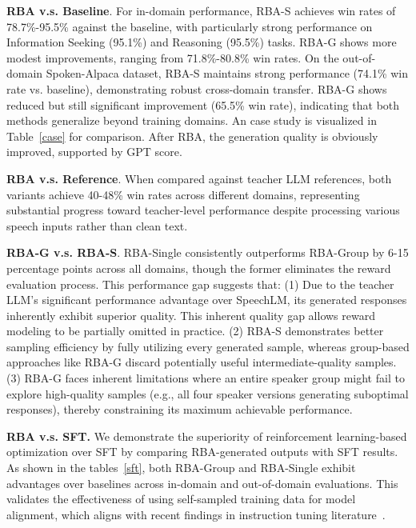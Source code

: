 \documentclass[letterpaper]{article} %
\begin{document}
\noindent \textbf{RBA v.s. Baseline}. For in-domain performance, RBA-S achieves win rates of 78.7\%-95.5\% against the baseline, with particularly strong performance on Information Seeking (95.1\%) and Reasoning (95.5\%) tasks. RBA-G shows more modest improvements, ranging from 71.8\%-80.8\% win rates. On the out-of-domain Spoken-Alpaca dataset, RBA-S maintains strong performance (74.1\% win rate vs. baseline), demonstrating robust cross-domain transfer. RBA-G shows reduced but still significant improvement (65.5\% win rate), indicating that both methods generalize beyond training domains. An case study is visualized in Table~\ref{case} for comparison. After RBA, the generation quality is obviously improved, supported by GPT score.  \par
\noindent \textbf{RBA v.s. Reference}. When compared against teacher LLM references, both variants achieve 40-48\% win rates across different domains, representing substantial progress toward teacher-level performance despite processing various speech inputs rather than clean text. \par
\noindent \textbf{RBA-G v.s. RBA-S}. RBA-Single consistently outperforms RBA-Group by 6-15 percentage points across all domains, though the former eliminates the reward evaluation process. This performance gap suggests that: (1) Due to the teacher LLM's significant performance advantage over SpeechLM, its generated responses inherently exhibit superior quality. This inherent quality gap allows reward modeling to be partially omitted in practice. (2) RBA-S demonstrates better sampling efficiency by fully utilizing every generated sample, whereas group-based approaches like RBA-G discard potentially useful intermediate-quality samples. (3) RBA-G faces inherent limitations where an entire speaker group might fail to explore high-quality samples (e.g., all four speaker versions generating suboptimal responses), thereby constraining its maximum achievable performance. \par
\noindent \textbf{RBA v.s. SFT.} We demonstrate the superiority of reinforcement learning-based optimization over SFT by comparing RBA-generated outputs with SFT results. As shown in the tables~\ref{sft}, both RBA-Group and RBA-Single exhibit advantages over baselines across in-domain and out-of-domain evaluations. This validates the effectiveness of using self-sampled training data for model alignment, which aligns with recent findings in instruction tuning literature~\cite{chen2024self}.

\
\end{document}
